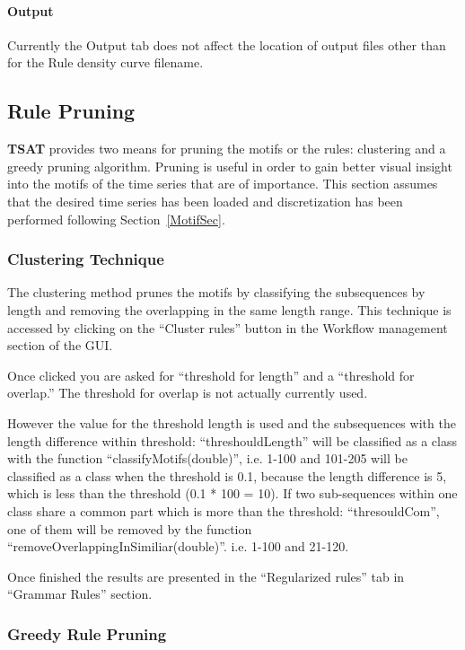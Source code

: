 \documentclass[letterpaper, 12pt]{article}
\newcommand\TSAT{\textbf{TSAT}}
\begin{document}
\paragraph{Output}
Currently the Output tab does not affect the location of output files other than for the Rule density curve filename. 


\subsection{Rule Pruning}

{\TSAT} provides two means for pruning the motifs or the rules: clustering and a greedy pruning algorithm.  Pruning is useful in order to gain better visual insight into the motifs of the time series that are of importance.  This section assumes that the desired time series has been loaded and discretization has been performed following Section~\ref{MotifSec}.

\subsubsection{Clustering Technique}

The clustering method prunes the motifs by classifying the subsequences by length and removing the overlapping in the same length range. This technique is accessed by clicking on the ``Cluster rules'' button in the Workflow management section of the GUI.

Once clicked you are asked for ``threshold for length'' and a ``threshold for overlap.''  The threshold for overlap is not actually currently used.

However the value for the threshold length is used and the subsequences with the length difference within threshold: ``threshouldLength'' will be classified as a class with the function ``classifyMotifs(double)'', i.e. 1-100 and 101-205 will be classified as a class when the threshold is 0.1, because the length difference is 5, which is less than the threshold (0.1 * 100 = 10). If two sub-sequences within one class share a common part which is more than the threshold: ``thresouldCom'', one of them will be removed by the function ``removeOverlappingInSimiliar(double)''. i.e. 1-100 and 21-120.

Once finished the results are presented in the ``Regularized rules'' tab in ``Grammar Rules'' section.

\subsubsection{Greedy Rule Pruning}
\end{document}
